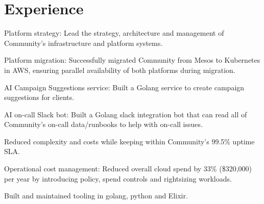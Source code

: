 \documentclass[]{resume}
\begin{document}
%
%

%
%

%
%

\begin{minipage}[t]{0.60\textwidth}

\section{Experience}
\vspace{\topsep} %
\begin{tightemize}
\item Platform strategy: Lead the strategy, architecture and management of Community's infrastructure and platform systems.
\item Platform migration: Successfully migrated Community from Mesos to Kubernetes in AWS, ensuring parallel availability of both platforms during migration.
\item AI Campaign Suggestions service: Built a Golang service to create campaign suggestions for clients.
\item AI on-call Slack bot: Built a Golang slack integration bot that can read all of Community's on-call data/runbooks to help with on-call issues.
\item Reduced complexity and costs while keeping within Community's 99.5\% uptime SLA.
\item Operational cost management: Reduced overall cloud spend by 33\% (\$320,000) per year by introducing policy, spend controls and rightsizing workloads.
\item Built and maintained tooling in golang, python and Elixir.
\end{tightemize}
\sectionsep


\end{minipage}
\end{document}
